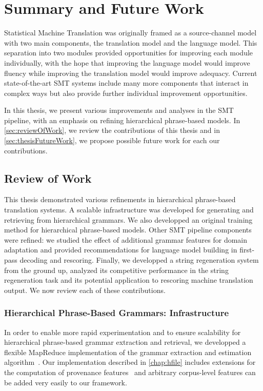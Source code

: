 \chapter{Summary and Future Work}


Statistical Machine Translation was originally framed as a source-channel
model with two main components, the translation model and the
language model. This separation into two modules provided opportunities
for improving each module individually, with the hope that improving the language model
would improve fluency while improving the translation model would improve
adequacy. Current state-of-the-art SMT systems include many more components
that interact in complex ways but also provide further individual improvement
opportunities.

In this thesis, we present various improvements and analyses in the
SMT pipeline, with an emphasis on refining hierarchical phrase-based
models. In \autoref{sec:reviewOfWork}, we review the contributions of
this thesis and in \autoref{sec:thesisFutureWork}, we propose
possible future work for each our contributions.

\section{Review of Work}
\label{sec:reviewOfWork}

This thesis demonstrated various refinements in
hierarchical phrase-based translation systems.
A scalable infrastructure was developed for generating
and retrieving from hierarchical grammars. We also
developped an original training method for hierarchical
phrase-based models. Other SMT pipeline components
were refined: we studied the effect of additional
grammar features for domain adaptation and provided recommendations
for language model building in first-pass decoding and rescoring.
Finally, we developped a string regeneration system from the
ground up, analyzed its competitive performance in
the string regeneration task and its potential application to
rescoring machine translation output. We now review each of
these contributions.

\subsection{Hierarchical Phrase-Based Grammars: Infrastructure}

In order to enable more rapid experimentation and to ensure
scalability for hierarchical phrase-based grammar extraction
and retrieval, we developped a flexible MapReduce implementation
of the grammar extraction and estimation
algorithm~\citep{dyer-cordova-mont-lin:2008:WMT}.
Our implementation described in \autoref{chap:hfile} includes
extensions for the computation
of provenance
features~\citep{chiang-deneefe-pust:2011:ACL} and arbitrary
corpus-level features can be added very easily to our framework.


